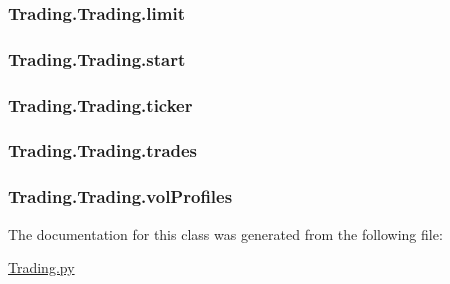 \hypertarget{class_trading_1_1_trading_a2e65634a069b16b2fb6f143e22792ac8}{
\subsubsection[{limit}]{\setlength{\rightskip}{0pt plus 5cm}Trading.\-Trading.\-limit}}\label{class_trading_1_1_trading_a2e65634a069b16b2fb6f143e22792ac8}
\hypertarget{class_trading_1_1_trading_a2637cbc665ef4f9cb899e110d9832f08}{
\subsubsection[{start}]{\setlength{\rightskip}{0pt plus 5cm}Trading.\-Trading.\-start}}\label{class_trading_1_1_trading_a2637cbc665ef4f9cb899e110d9832f08}
\hypertarget{class_trading_1_1_trading_afb27188fcbb7c4e4676e471e6e329d75}{
\subsubsection[{ticker}]{\setlength{\rightskip}{0pt plus 5cm}Trading.\-Trading.\-ticker}}\label{class_trading_1_1_trading_afb27188fcbb7c4e4676e471e6e329d75}
\hypertarget{class_trading_1_1_trading_a0843b12ca61d641a6f1a3802997160ba}{
\subsubsection[{trades}]{\setlength{\rightskip}{0pt plus 5cm}Trading.\-Trading.\-trades}}\label{class_trading_1_1_trading_a0843b12ca61d641a6f1a3802997160ba}
\hypertarget{class_trading_1_1_trading_aceddec60e3e5fc73596da8fb0a9c847a}{
\subsubsection[{vol\-Profiles}]{\setlength{\rightskip}{0pt plus 5cm}Trading.\-Trading.\-vol\-Profiles}}\label{class_trading_1_1_trading_aceddec60e3e5fc73596da8fb0a9c847a}


The documentation for this class was generated from the following file\-:\begin{DoxyCompactItemize}
\item 
\hyperlink{_trading_8py}{Trading.\-py}\end{DoxyCompactItemize}

